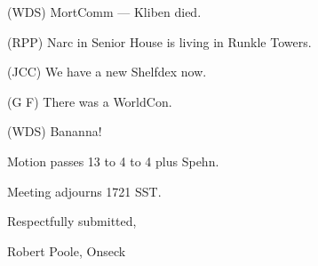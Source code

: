 (WDS) MortComm --- Kliben died.

(RPP) Narc in Senior House is living in Runkle Towers.

(JCC) We have a new Shelfdex now.

(G F) There was a WorldCon.

(WDS) Bananna!

Motion passes 13 to 4 to 4 plus Spehn.

Meeting adjourns 1721 SST.

\vspace{0.15in}
\begin{center}
Respectfully submitted,

Robert Poole, Onseck
\end{center}

